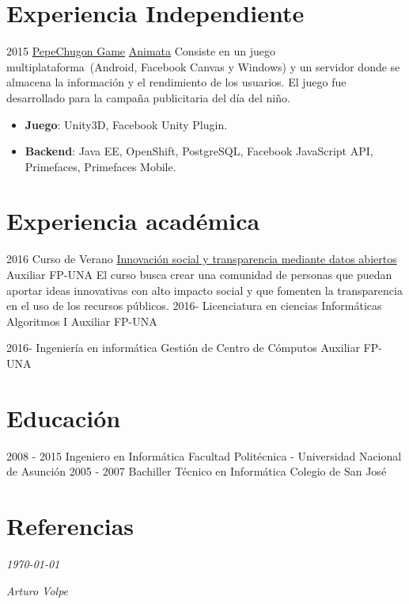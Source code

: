 \documentclass[]{friggeri-cv}
\begin{document}
\section{Experiencia Independiente}
\proyectof
    {2015}
    {\href{https://apps.facebook.com/pechugon_pepe}{PepeChugon Game}}
    {\href{http://www.animata.com.py/}{Animata}}
    {Consiste en un juego multiplataforma~(Android, Facebook Canvas y Windows)
        y un servidor donde se almacena la información y el rendimiento de los
        usuarios. El juego fue desarrollado para la campaña publicitaria del día
        del niño.}
    {\begin{itemize}
            \item \textbf{Juego}: Unity3D, Facebook Unity Plugin.
            \item \textbf{Backend}: Java EE, OpenShift, PostgreSQL, Facebook
                JavaScript API, Primefaces, Primefaces Mobile.
        \end{itemize}}

    \section{Experiencia académica}
\clase
    {2016}
    {Curso de Verano}
    {\href{http://www.pol.una.py/cursosverano/index.php?option=com_content&view=article&layout=edit&id=91}{Innovación
            social y transparencia mediante datos abiertos}} 
    {Auxiliar}
    {FP-UNA}
    {El curso busca crear una comunidad de personas que puedan aportar ideas
        innovativas con alto impacto social y que fomenten la transparencia en
        el uso de los recursos públicos. }
\clase
    {2016-}
    {Licenciatura en ciencias Informáticas}
    {Algoritmos I} 
    {Auxiliar}
    {FP-UNA}
    {}

\clase
    {2016-}
    {Ingeniería en informática}
    {Gestión de Centro de Cómputos} 
    {Auxiliar}
    {FP-UNA}
    {}

\section{Educación}
\begin{entrylist}
  \entry
    {2008 - 2015}
    {Ingeniero en Informática}
    {Facultad Politécnica - Universidad Nacional de Asunción}
    {}
  \entry
    {2005 - 2007}
    {Bachiller Técnico en Informática}
    {Colegio de San José}
    {}
\end{entrylist}



\section{Referencias}
\begin{entrylist}
\end{entrylist}

\begin{flushleft}
    \emph{\today{}}
\end{flushleft}
\begin{flushright}
    \emph{Arturo Volpe}
\end{flushright}
\end{document}

